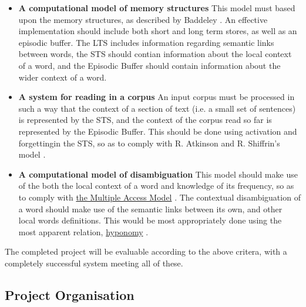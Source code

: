 \documentclass[]{article}
\begin{document}
\begin{itemize}
	\item \textbf{A computational model of memory structures} \newline
		This model must based upon the memory structures, as described by Baddeley \cite{MemoryBaddeleyEysenkAnderson}. An effective implementation should include both short and long term stores, as well as an episodic buffer. The LTS includes information regarding semantic links between words, the STS should contian information about the local context of a word, and the Episodic Buffer should contain information about the wider context of a word.
	
	\item \textbf{A system for reading in a corpus} \newline
	An input corpus must be processed in such a way that the context of a section of text (i.e. a small set of sentences) is represented by the STS, and the context of the corpus read so far is represented by the Episodic Buffer. This should be done using activation and forgettingin the STS, so as to comply with R. Atkinson and R. Shiffrin's model \cite{ControlProcessesSTMAtkinson}.
		
	
	\item \textbf{A computational model of disambiguation} \newline
	This model should make use of the both the local context of a word and knowledge of its frequency, so as to comply with \hyperref[sec:DisambiguationModels]{the Multiple Access Model} \cite{PsychologyOfLanguage}. The contextual disambiguation of a word should make use of the semantic links between its own, and other local words definitions. This would be most appropriately done using the most apparent relation, \hyperref[Hypernym]{hyponomy} \cite{WN2Nouns, WN4Verbs}.
	
\end{itemize}

The completed project will be evaluable according to the above critera, with a completely successful system meeting all of these.

\subsection{Project Organisation}
\label{sec:ProjectOrg}
\end{document}

